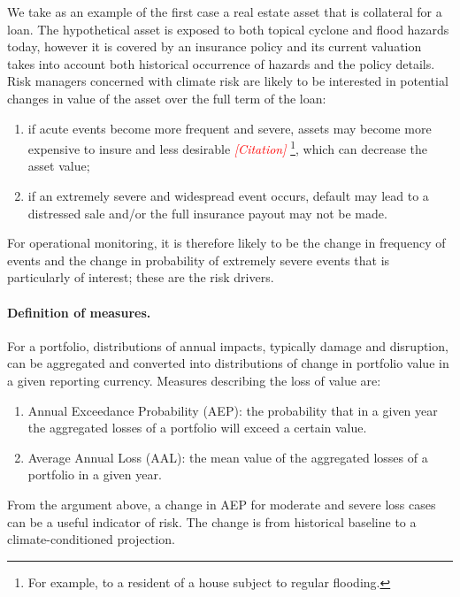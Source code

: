 \documentclass[a4paper,11pt]{extarticle} %
\theoremstyle{definition}
\begin{document}
We take as an example of the first case a real estate asset that is collateral for a loan. The hypothetical asset is exposed to both topical cyclone and flood hazards today, however it is covered by an insurance policy and its current valuation takes into account both historical occurrence of hazards and the policy details. Risk managers concerned with climate risk are likely to be interested in potential changes in value of the asset over the full term of the loan:

\begin{enumerate}
    \item if acute events become more frequent and severe, assets may become more expensive to insure and less desirable {\textcolor{red}{\emph{[Citation]}}} \footnote{For example, to a resident of a house subject to regular flooding.}, which can decrease the asset value;
    \item if an extremely severe and widespread event occurs, default may lead to a distressed sale and/or the full insurance payout may not be made.
\end{enumerate}

For operational monitoring, it is therefore likely to be the change in frequency of events and the change in probability of extremely severe events that is particularly of interest; these are the risk drivers.

\paragraph{Definition of measures.} For a portfolio, distributions of annual impacts, typically damage and disruption, can be aggregated and converted into distributions of change in portfolio value in a given reporting currency. Measures describing the loss of value are:

\begin{enumerate}
    \item Annual Exceedance Probability (AEP): the probability that in a given year the aggregated losses of a portfolio will exceed a certain value.
    \item Average Annual Loss (AAL): the mean value of the aggregated losses of a portfolio in a given year.
\end{enumerate}

From the argument above, a change in AEP for moderate and severe loss cases can be a useful indicator of risk. The change is from historical baseline to a climate-conditioned projection.
\end{document}

